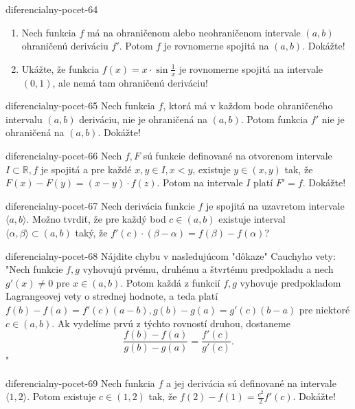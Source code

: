 \begin{defproblem}{diferencialny-pocet-64}
\begin{enumerate}
\item Nech funkcia $f$ má na ohraničenom alebo neohraničenom intervale $(a,b)$ ohraničenú deriváciu $f'$. Potom $f$ je rovnomerne spojitá na $(a,b)$. Dokážte!
\item Ukážte, že funkcia $f(x)=x\cdot \sin \frac{1}{x}$ je rovnomerne spojitá na intervale $(0,1)$, ale nemá tam ohraničenú deriváciu!
\end{enumerate}
\end{defproblem}

\begin{defproblem}{diferencialny-pocet-65}
Nech funkcia $f$, ktorá má v každom bode ohraničeného intervalu $(a,b)$ deriváciu, nie je ohraničená na $(a,b)$. Potom funkcia $f'$ nie je ohraničená na $(a,b)$. Dokážte!
\end{defproblem}

\begin{defproblem}{diferencialny-pocet-66}
Nech $f,F$ sú funkcie definované na otvorenom intervale $I \subset \mathbb{R},f$ je spojitá a pre každé $x,y\in I,x<y$, existuje $y\in (x,y)$ tak, že $F(x)-F(y)=(x-y)\cdot f(z)$. Potom na intervale $I$ platí $F'=f$. Dokážte!
\end{defproblem}

\begin{defproblem}{diferencialny-pocet-67}
Nech derivácia funkcie $f$ je spojitá na uzavretom intervale $\langle a,b \rangle$. Možno tvrdiť, že pre každý bod $c\in (a,b)$ existuje interval $\langle \alpha,\beta \rangle \subset (a,b)$ taký, že $f'(c)\cdot (\beta-\alpha)=f(\beta)-f(\alpha)$?
\end{defproblem}

\begin{defproblem}{diferencialny-pocet-68}
Nájdite chybu v nasledujúcom "dôkaze" Cauchyho vety: "Nech funkcie $f,g$ vyhovujú prvému, druhému a štvrtému predpokladu a nech $g'(x)\neq 0$ pre $x\in (a,b)$. Potom každá z funkcií $f,g$ vyhovuje predpokladom Lagrangeovej vety o strednej hodnote, a teda platí $f(b)-f(a)=f'(c)(a-b),g(b)-g(a)=g'(c)(b-a)$ pre niektoré $c\in (a,b)$. Ak vydelíme prvú z týchto rovností druhou, dostaneme 
$$\frac{f(b)-f(a)}{g(b)-g(a)}=\frac{f'(c)}{g'(c)}.$$"
\end{defproblem}

\begin{defproblem}{diferencialny-pocet-69}
Nech funkcia $f$ a jej derivácia sú definované na intervale $\langle 1,2 \rangle$. Potom existuje $c\in (1,2)$ tak, že $f(2)-f(1)=\frac{c^2}{2}f'(c)$. Dokážte!
\end{defproblem}

